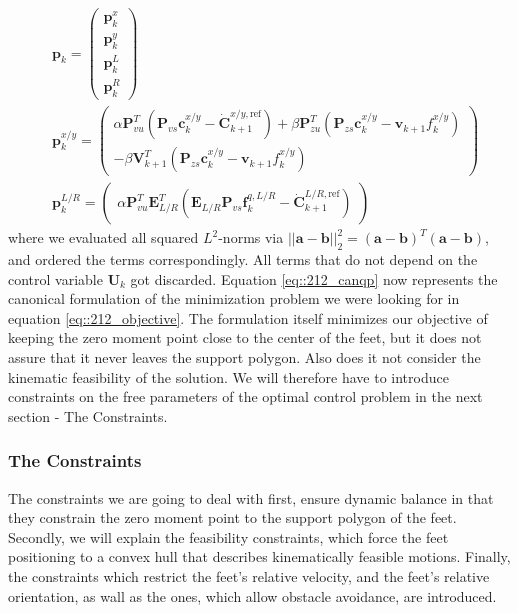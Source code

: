 \begin{align}
	&\bm{p}_k = \begin{pmatrix}
		\bm{p}_k^x \\
		\bm{p}_k^y \\
		\bm{p}_k^{L} \\
		\bm{p}_k^{R}
	\end{pmatrix} \\
	& \bm{p}_k^{x/y} = \begin{pmatrix}
		\alpha\bm{P}_{vu}^T(\bm{P}_{vs}\bm{c}_k^{x/y}-\dot{\bm{C}}_{k+1}^{x/y,\text{ref}}) + \beta\bm{P}_{zu}^T(\bm{P}_{zs}\bm{c}_k^{x/y}-\bm{v}_{k+1}f_k^{x/y})\\
		-\beta\bm{V}_{k+1}^T(\bm{P}_{zs}\bm{c}_k^{x/y}-\bm{v}_{k+1}f_k^{x/y})
	\end{pmatrix} \\
	& \bm{p}_k^{L/R} = \begin{pmatrix}
		\alpha\bm{P}_{vu}^T\bm{E}_{L/R}^T(\bm{E}_{L/R}\bm{P}_{vs}\bm{f}_k^{q,L/R}-\dot{\bm{C}}_{k+1}^{L/R,\text{ref}})
	\end{pmatrix}
\end{align}
where we evaluated all squared $L^2$-norms via $||\bm{a}-\bm{b}||^2_2 = (\bm{a}-\bm{b})^T(\bm{a}-\bm{b})$, and ordered the terms correspondingly. All terms that do not depend on the control variable $\bm{U}_k$ got discarded. Equation \ref{eq::212_canqp} now represents the canonical formulation of the minimization problem we were looking for in equation \ref{eq::212_objective}. The formulation itself minimizes our objective of keeping the zero moment point close to the center of the feet, but it does not assure that it never leaves the support polygon. Also does it not consider the kinematic feasibility of the solution. We will therefore have to introduce constraints on the free parameters of the optimal control problem in the next section - The Constraints.
\FloatBarrier
\subsubsection{The Constraints}
The constraints we are going to deal with first, ensure dynamic balance in that they constrain the zero moment point to the support polygon of the feet. Secondly, we will explain the feasibility constraints, which force the feet positioning to a convex hull that describes kinematically feasible motions. Finally, the constraints which restrict the feet's relative velocity, and the feet's relative orientation, as wall as the ones, which allow obstacle avoidance, are introduced.
